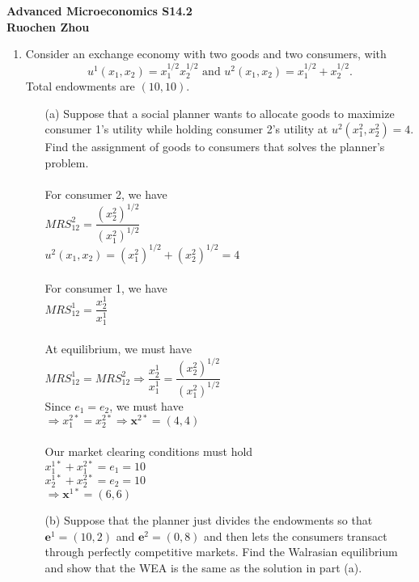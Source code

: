 \documentclass[11pt]{article}
\begin{document}
\begin{center}
\textbf{Advanced Microeconomics S14.2\\}
\textbf{Ruochen Zhou}
\end{center}

\begin{enumerate}

\item Consider an exchange economy with two goods and two consumers, with
 	\begin{equation*}
	u^{1}(x_{1},x_{2})=x_{1}^{1/2}x_{2}^{1/2}\text{ and }u^{2}(x_{1},x_{2})=x_{1}^{1/2}+x_{2}^{1/2}.
	\end{equation*}
	Total endowments are $(10,10)$.
	\begin{itemize}
	\item[(a)] Suppose that a social planner wants to allocate goods to maximize consumer 1's utility while holding consumer 2's utility at $u^{2}(x_{1}^{2},x_{2}^{2})=4$. Find the assignment of goods to consumers that solves the planner's problem.
	\smallskip\\\\
	For consumer 2, we have\\
	$MRS_{12}^2=\dfrac{(x_2^2)^{1/2}}{(x_1^2)^{1/2}}$\\
	$u^2(x_1,x_2)=(x_1^2)^{1/2}+(x_2^2)^{1/2}=4$\\\\
	For consumer 1, we have\\
	$MRS_{12}^1=\dfrac{x_2^1}{x_1^1}$\\\\
	At equilibrium, we must have\\
	$MRS_{12}^1=MRS_{12}^2\Rightarrow\dfrac{x_2^1}{x_1^1}=\dfrac{(x_2^2)^{1/2}}{(x_1^2)^{1/2}}$\\
	Since $e_1=e_2$, we must have\\
	$\Rightarrow x_1^{2*}=x_2^{2*}\Rightarrow\textbf{x}^{2*}=(4,4)$\\\\
	Our market clearing conditions must hold\\
	$x_1^{1*}+x_1^{2*}=e_1=10$\\
	$x_2^{1*}+x_2^{2*}=e_2=10$\\
	$\Rightarrow\textbf{x}^{1*}=(6,6)$\\
	\item[(b)] Suppose that the planner just divides the endowments so that $\mathbf{e}^{1}=(10,2)$ and $\mathbf{e}^{2}=(0,8)$ and then lets the consumers transact through perfectly competitive markets. Find the Walrasian equilibrium and show that the WEA is the same as the solution in part (a).

\end{itemize}
\end{enumerate}
\end{document}
